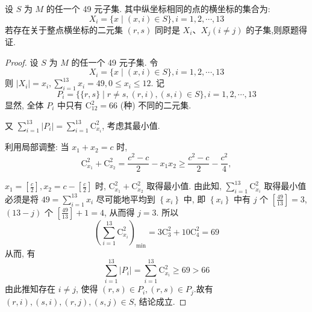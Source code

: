 \begin{analysis}
	设 $S$ 为 $M$ 的任一个 49 元子集. 其中纵坐标相同的点的横坐标的集合为:
	$$
		X_{i}=\{x \mid(x, i) \in S\}, i=1,2, \cdots, 13
	$$
	若存在关于整点横坐标的二元集 $(r, s)$ 同时是 $X_{i} 、 X_{j}(i \neq j)$ 的子集,则原题得证.
\end{analysis}
\begin{proof}
	设 $S$ 为 $M$ 的任一个 49 元子集. 令
	$$
		X_{i}=\{x \mid(x, i) \in S\}, i=1,2, \cdots, 13
	$$
	则 $\left|X_{i}\right|=x_{i}, \sum_{i=1}^{13} x_{i}=49,0 \leqslant x_{i} \leqslant 12$. 记
	$$
		P_{i}=\{\{r, s\} \mid r \neq s,(r, i),(s, i) \in S\}, i=1,2, \cdots, 13
	$$
	显然, 全体 $P_{i}$ 中只有 $\mathrm{C}_{12}^{2}=66$ (种) 不同的二元集.

	又 $\sum_{i=1}^{13}\left|P_{i}\right|=\sum_{i=1}^{13} \mathrm{C}_{x_{i}}^{2}$, 考虑其最小值.

	利用局部调整: 当 $x_{1}+x_{2}=c$ 时,
	$$
		\mathrm{C}_{x_{1}}^{2}+\mathrm{C}_{x_{2}}^{2}=\frac{c^{2}-c}{2}-x_{1} x_{2} \geqslant \frac{c^{2}-c}{2}-\frac{c^{2}}{4},
	$$

	$x_{1}=\left[\frac{c}{2}\right], x_{2}=c-\left[\frac{c}{2}\right]$ 时, $\mathrm{C}_{x_{1}}^{2}+\mathrm{C}_{x_{2}}^{2}$ 取得最小值. 由此知, $\sum_{i=1}^{13} \mathrm{C}_{x_{i}}^{2}$ 取得最小值必须是将 $49=\sum_{i=1}^{13} x_{i}$ 尽可能地平均到 $\left\{x_{i}\right\}$ 中, 即 $\left\{x_{i}\right\}$ 中有 $j$ 个 $\left[\frac{49}{13}\right]=3$,\\
	$(13-j)$ 个 $\left[\frac{49}{13}\right]+1=4$, 从而得 $j=3$.
	所以
	$$
		\left(\sum_{i=1}^{13} \mathrm{C}_{x_{i}}^{2}\right)_{\min }=3 \mathrm{C}_{3}^{2}+10 \mathrm{C}_{4}^{2}=69
	$$
	从而, 有
	$$
		\sum_{i=1}^{13}\left|P_{i}\right|=\sum_{i=1}^{13} \mathrm{C}_{x_{i}}^{2} \geqslant 69>66
	$$
	由此推知存在 $i \neq j$, 使得 $(r, s) \in P_{i},(r, s) \in P_{j}$.故有 $(r, i),(s, i),(r, j),(s, j) \in S$, 结论成立.
\end{proof}

